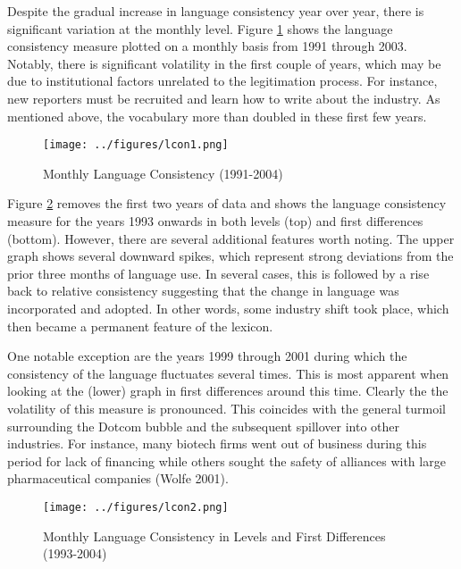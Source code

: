 Despite the gradual increase in language consistency year over year, there is significant variation at the monthly level. Figure \ref{lcon1} shows the language consistency measure plotted on a monthly basis from 1991 through 2003. Notably, there is significant volatility in the first couple of years, which may be due to institutional factors unrelated to the legitimation process. For instance, new reporters must be recruited and learn how to write about the industry. As mentioned above, the vocabulary more than doubled in these first few years. 

\begin{figure}
\begin{center}
\texttt{[image: ../figures/lcon1.png]}
\caption[Monthly Language Consistency (1991-2004)]{Monthly Language Consistency (1991-2004)\label{lcon1}}
\end{center}
\end{figure}

Figure \ref{lcon2} removes the first two years of data and shows the language consistency measure for the years 1993 onwards in both levels (top) and first differences (bottom). However, there are several additional features worth noting. The upper graph shows several downward spikes, which represent strong deviations from the prior three months of language use. In several cases, this is followed by a rise back to relative consistency suggesting that the change in language was incorporated and adopted. In other words, some industry shift took place, which then became a permanent feature of the lexicon.

One notable exception are the years 1999 through 2001 during which the consistency of the language fluctuates several times. This is most apparent when looking at the (lower) graph in first differences around this time. Clearly the the volatility of this measure is pronounced. This coincides with the general turmoil surrounding the Dotcom bubble and the subsequent spillover into other industries. For instance, many biotech firms went out of business during this period for lack of financing while others sought the safety of alliances with large pharmaceutical companies (Wolfe 2001).

\begin{figure}
\begin{center}
\texttt{[image: ../figures/lcon2.png]}
\caption[Monthly Language Consistency, Levels and Differences (1993-2004)]{Monthly Language Consistency in Levels and First Differences (1993-2004)\label{lcon2}}
\end{center}
\end{figure}

